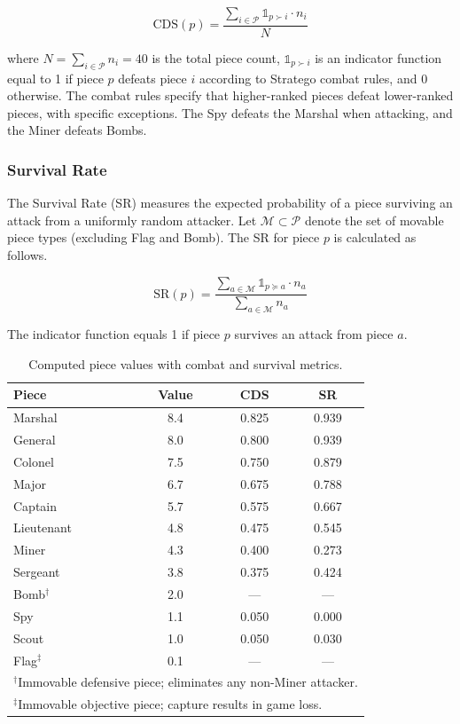 \begin{equation}
\text{CDS}(p) = \frac{\sum_{i \in \mathcal{P}} \mathbb{1}_{p \succ i} \cdot n_i}{N}
\end{equation}

\noindent where $N = \sum_{i \in \mathcal{P}} n_i = 40$ is the total piece count, $\mathbb{1}_{p \succ i}$ is an indicator function equal to 1 if piece $p$ defeats piece $i$ according to Stratego combat rules, and 0 otherwise. The combat rules specify that higher-ranked pieces defeat lower-ranked pieces, with specific exceptions. The Spy defeats the Marshal when attacking, and the Miner defeats Bombs.

\subsubsection{Survival Rate}
The Survival Rate (SR) measures the expected probability of a piece surviving an attack from a uniformly random attacker. Let $\mathcal{M} \subset \mathcal{P}$ denote the set of movable piece types (excluding Flag and Bomb). The SR for piece $p$ is calculated as follows.

\begin{equation}
\text{SR}(p) = \frac{\sum_{a \in \mathcal{M}} \mathbb{1}_{p \succeq a} \cdot n_a}{\sum_{a \in \mathcal{M}} n_a}
\end{equation}

The indicator function equals 1 if piece $p$ survives an attack from piece $a$.

\begin{table}[h]
\centering
\caption{Computed piece values with combat and survival metrics.}
\label{tab:piece_values}
\begin{tabular}{lccc}
\hline
\textbf{Piece} & \textbf{Value} & \textbf{CDS} & \textbf{SR} \\
\hline
Marshal & 8.4 & 0.825 & 0.939 \\
General & 8.0 & 0.800 & 0.939 \\
Colonel & 7.5 & 0.750 & 0.879 \\
Major & 6.7 & 0.675 & 0.788 \\
Captain & 5.7 & 0.575 & 0.667 \\
Lieutenant & 4.8 & 0.475 & 0.545 \\
Miner & 4.3 & 0.400 & 0.273 \\
Sergeant & 3.8 & 0.375 & 0.424 \\
Bomb$^{\dagger}$ & 2.0 & --- & --- \\
Spy & 1.1 & 0.050 & 0.000 \\
Scout & 1.0 & 0.050 & 0.030 \\
Flag$^{\ddagger}$ & 0.1 & --- & --- \\
\hline
\multicolumn{4}{l}{\footnotesize $^{\dagger}$Immovable defensive piece; eliminates any non-Miner attacker.} \\
\multicolumn{4}{l}{\footnotesize $^{\ddagger}$Immovable objective piece; capture results in game loss.} \\
\end{tabular}
\end{table}

